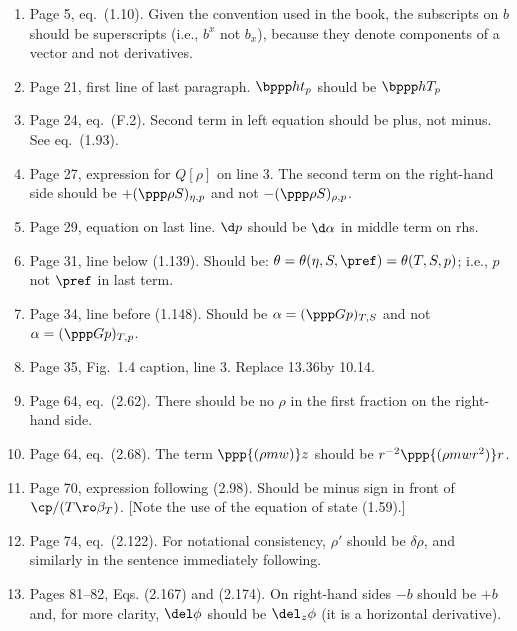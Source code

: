 \documentclass[10pt]{article}
\newcommand{\eq}{eq.\ } \newcommand{\Eq}{Eq.\ }
\begin{document}
\bigskip

\begin{enumerate}

\item Page 5, \eq (1.10).  Given the  convention used in the book, the subscripts on $b$ should be superscripts (i.e., $b^x$ not $b_x$), because they denote components of a vector and not derivatives. 

\item Page 21, first line of last paragraph. $\bppp h t _p$ should be $\bppp hT_p$

\item Page 24, \eq (F.2). Second term in left equation should be plus, not minus. See \eq (1.93).

\item Page 27, expression for $Q[\rho]$ on line 3. The second term on the right-hand side should be $+ (\ppp \rho S)_{\eta,p}$ and not $-(\ppp \rho S)_{\rho,p}$.

\item Page 29, equation on last line. $\d p$ should be $\d \alpha$ in middle term on rhs.

\item Page 31, line below (1.139). Should be: $\theta = \theta(\eta, S, \pref) = \theta (T, S, p)$; i.e., $p$ not $\pref$ in last term.

\item Page 34, line before (1.148). Should be $\alpha  = (\ppp G p)_{T,S}$ and not
$\alpha  = (\ppp G p)_{T,p}$.

\item Page 35, Fig.\ 1.4 caption, line 3. Replace 13.36\dgc by 10.14\dgc. 


\item Page 64, \eq (2.62). There should be no $\rho$ in the first fraction on the right-hand side.  

\item Page 64, \eq (2.68). The term $\ppp{(\rho m w)} z$ should be $r^{-2}\ppp{(\rho m w r^2)} r $.

\item Page 70, expression following (2.98). Should be minus sign in front of $\cp/(T 
\ro\beta_T)$. [Note the use of the equation of state (1.59).] 

\item Page 74, \eq (2.122). For notational consistency, $\rho'$ should be $\delta \rho$, and similarly in the sentence immediately following.

\item Pages 81--82, Eqs. (2.167) and (2.174). On right-hand sides $-b$ should be $+b$ and, for more clarity, $\del \phi$ should be $\del_z\phi$ (it is a horizontal derivative).


\end{enumerate}
\end{document}

